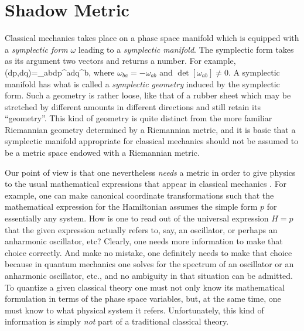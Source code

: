 \section{Shadow Metric}
Classical mechanics takes place on a phase space manifold which is 
equipped with a {\it symplectic form} $\omega$ leading to a 
{\it symplectic manifold}. The symplectic form takes as its argument 
two vectors and returns a number. For example, 
  \bn \omega(dp,dq)=\omega_{ab}\s dp^a\s dq^b\;,  \en
where $\omega_{ba}=-\omega_{ab}$ and $\det[\omega_{ab}]\not=0$. A 
symplectic manifold has what is called a 
{\it symplectic geometry} induced by the symplectic form. Such a 
geometry is rather
loose, like that of a rubber sheet which may be stretched by different 
amounts in different directions and still retain its ``geometry''. This 
kind of geometry is quite distinct from the more familiar Riemannian 
geometry determined by a Riemannian metric, and it is basic that a 
symplectic manifold appropriate for classical mechanics should not be 
assumed to be a metric space endowed with a Riemannian metric.

Our point of view is that one nevertheless {\it needs} a metric in order 
to give physics to the usual mathematical expressions that appear in 
classical mechanics \cite{kla77}. For example, one can make canonical 
coordinate transformations such that the mathematical expression for the 
Hamiltonian assumes the simple form $p$ for essentially any system. How 
is one to read out of the universal expression $H=p$ that the given 
expression actually refers to, say, an oscillator, or perhaps an 
anharmonic oscillator, etc? Clearly, one needs more information to make 
that choice correctly. And make no mistake, one definitely needs to make 
that choice because in quantum mechanics one solves for the spectrum of an 
oscillator or an anharmonic oscillator, etc., and no ambiguity in that 
situation can be admitted. To quantize a given classical theory one must 
not only know its mathematical formulation in terms of the phase space 
variables, but, at the same time, one must know to what physical system 
it refers. Unfortunately, this kind of information is simply {\it not} 
part of a traditional classical theory.


